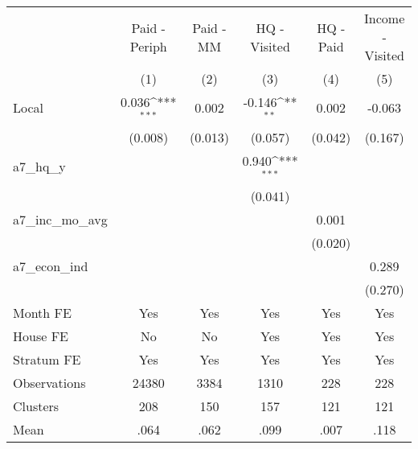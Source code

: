 {
\def\sym#1{\ifmmode^{#1}\else\(^{#1}\)\fi}
\begin{tabular}{l*{5}{c}}
\hline\hline
                &\multicolumn{1}{c}{Paid - Periph}&\multicolumn{1}{c}{Paid - MM}&\multicolumn{1}{c}{HQ - Visited}&\multicolumn{1}{c}{HQ - Paid}&\multicolumn{1}{c}{Income - Visited}\\
                &\multicolumn{1}{c}{(1)}         &\multicolumn{1}{c}{(2)}         &\multicolumn{1}{c}{(3)}         &\multicolumn{1}{c}{(4)}         &\multicolumn{1}{c}{(5)}         \\
\hline
Local           &    0.036\sym{***}&    0.002         &   -0.146\sym{**} &    0.002         &   -0.063         \\
                &  (0.008)         &  (0.013)         &  (0.057)         &  (0.042)         &  (0.167)         \\
a7\_hq\_y         &                  &                  &    0.940\sym{***}&                  &                  \\
                &                  &                  &  (0.041)         &                  &                  \\
a7\_inc\_mo\_avg   &                  &                  &                  &    0.001         &                  \\
                &                  &                  &                  &  (0.020)         &                  \\
a7\_econ\_ind     &                  &                  &                  &                  &    0.289         \\
                &                  &                  &                  &                  &  (0.270)         \\
Month FE        &      Yes         &      Yes         &      Yes         &      Yes         &      Yes         \\
House FE        &       No         &       No         &      Yes         &      Yes         &      Yes         \\
Stratum FE      &      Yes         &      Yes         &      Yes         &      Yes         &      Yes         \\
\hline
Observations    &    24380         &     3384         &     1310         &      228         &      228         \\
Clusters        &      208         &      150         &      157         &      121         &      121         \\
Mean            &     .064         &     .062         &     .099         &     .007         &     .118         \\
\hline\hline
\end{tabular}
}
